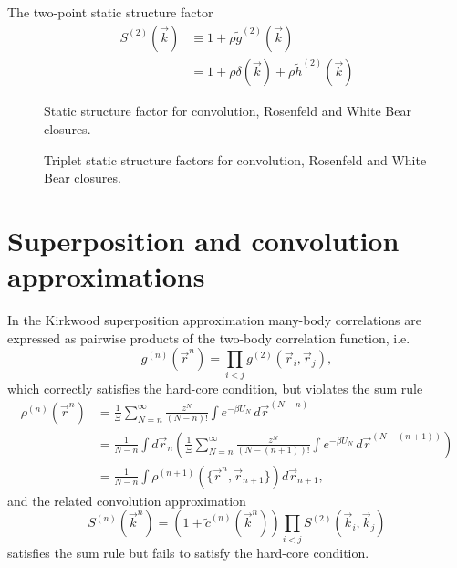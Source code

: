 \documentclass[12pt]{report}
\begin{document}
The two-point static structure factor
\begin{equation}
  \begin{aligned}
    S^{(2)}(\vec{k}) &\equiv 1 + \rho \tilde{g}^{(2)}(\vec{k}) \\
    &= 1 + \rho \delta(\vec{k}) + \rho \tilde{h}^{(2)}(\vec{k})
  \end{aligned}
\end{equation}

\begin{figure}
  \missingfigure[figwidth=\linewidth]{}
  \caption{Static structure factor for convolution, Rosenfeld and White Bear closures.}
\end{figure}

\begin{figure}
  \missingfigure[figwidth=\linewidth]{}
  \caption{Triplet static structure factors for convolution, Rosenfeld and White Bear closures.}
\end{figure}

\section{Superposition and convolution approximations}

In the Kirkwood superposition approximation \cite{Kirkwood1935} many-body correlations are expressed as pairwise products of the two-body correlation function, i.e.
\begin{equation}
  g^{(n)}(\vec{r}^n) =
  \prod_{i < j} g^{(2)}(\vec{r}_i, \vec{r}_j),
\end{equation}
which correctly satisfies the hard-core condition, but violates the sum rule
\begin{equation}
  \begin{aligned}
    \rho^{(n)}(\vec{r}^n) &=
    \frac{1}{\Xi} \sum_{N=n}^\infty \frac{z^N}{(N-n)!} \int e^{-\beta U_N} \, d\vec{r}^{(N-n)} \\
    &=
    \frac{1}{N-n}
    \int d\vec{r}_n \left(
    \frac{1}{\Xi} \sum_{N=n}^\infty \frac{z^N}{(N-(n+1))!} \int e^{-\beta U_N} \, d\vec{r}^{(N-(n+1))}
    \right) \\
    &=
    \frac{1}{N-n}
    \int \rho^{(n+1)}(\{\vec{r}^n, \vec{r}_{n+1}\}) d\vec{r}_{n+1},
  \end{aligned}
\end{equation}
and the related convolution approximation \cite{Jackson1962,Ichimaru1970,Barrat1988}%
\begin{equation}
  S^{(n)}(\vec{k}^n) =
  (1 + \tilde{c}^{(n)}(\vec{k}^n))
  \prod_{i < j} S^{(2)}(\vec{k}_i, \vec{k}_j)
\end{equation}
satisfies the sum rule but fails to satisfy the hard-core condition.
\end{document}
